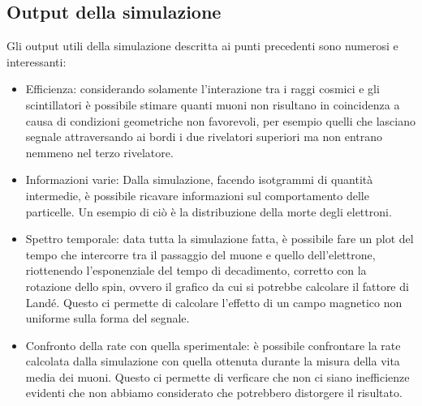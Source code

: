 \subsection{Output della simulazione}
Gli output utili della simulazione descritta ai punti precedenti sono numerosi e interessanti:
\begin{itemize}
\item Efficienza: considerando solamente l'interazione tra i raggi cosmici e gli scintillatori è possibile stimare quanti muoni non risultano in coincidenza a causa
di condizioni geometriche non favorevoli, per esempio quelli che lasciano segnale attraversando ai bordi i due rivelatori superiori ma non entrano nemmeno nel terzo
rivelatore.
\item Informazioni varie: Dalla simulazione, facendo isotgrammi di quantit\`a intermedie, \`e possibile ricavare informazioni sul comportamento delle particelle. Un esempio di ci\`o \`e la distribuzione della morte degli elettroni.
\item Spettro temporale: data tutta la simulazione fatta, è possibile fare un plot del tempo che intercorre tra il passaggio del muone e quello dell'elettrone, riottenendo
l'esponenziale del tempo di decadimento, corretto con la rotazione dello spin, ovvero il grafico da cui si potrebbe calcolare il fattore di Land\'e. Questo ci permette di calcolare l'effetto di un campo magnetico non uniforme sulla forma del segnale.
\item Confronto della rate con quella sperimentale: \`e possibile confrontare la rate calcolata dalla simulazione con quella ottenuta durante la misura della vita media dei muoni. Questo ci permette di verficare che non ci siano inefficienze evidenti che non abbiamo considerato che potrebbero distorgere il risultato.
\end{itemize}



